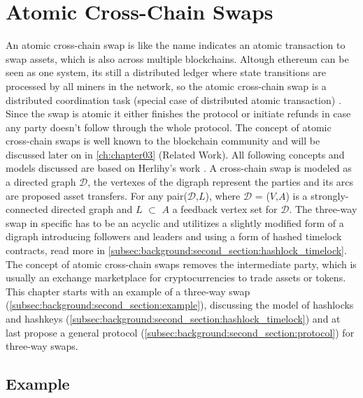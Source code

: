 \section{Atomic Cross-Chain Swaps}
\label{sec:background:fifth_section}
An atomic cross-chain swap is like the name indicates an atomic transaction to swap assets, which is also across multiple blockchains. Altough ethereum can be seen as one system, its still a distributed ledger where state transitions are processed by all miners in the network, so the atomic cross-chain swap is a distributed coordination task (special case of distributed atomic transaction) \cite{weikum2001transactional}. Since the swap is atomic it either finishes the protocol or initiate refunds in case any party doesn't follow through the whole protocol. The concept of atomic cross-chain swaps is well known to the blockchain community and will be discussed later on in \autoref{ch:chapter03} (Related Work). All following concepts and models discussed are based on Herlihy's work \cite{herlihy2018atomic}. A cross-chain swap is modeled as a directed graph $\mathcal{D}$, the vertexes of the digraph represent the parties and its arcs are proposed asset transfers. For any pair($\mathcal{D}$,$L$), where $\mathcal{D}$ = ($V$,$A$) is a strongly-connected directed graph and $L$ $\subset$ $A$ a feedback vertex set for $\mathcal{D}$. The three-way swap in specific has to be an acyclic and utilitizes a slightly modified form of a digraph introducing followers and leaders and using a form of hashed timelock contracts, read more in \autoref{subsec:background:second_section:hashlock_timelock}. The concept of atomic cross-chain swaps removes the intermediate party, which is usually an exchange marketplace for cryptocurrencies to trade assets or tokens. This chapter starts with an example of a three-way swap (\autoref{subsec:background:second_section:example}), discussing the model of hashlocks and hashkeys (\autoref{subsec:background:second_section:hashlock_timelock}) and at last propose a general protocol (\autoref{subsec:background:second_section:protocol}) for three-way swaps.



\subsection{Example}
\label{subsec:background:second_section:example}

